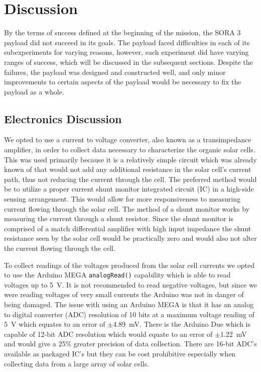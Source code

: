 \section{Discussion}
\label{sec:Discussion}

By the terms of success defined at the beginning of the mission, the SORA 3 payload did not succeed in its goals.
The payload faced difficulties in each of its subexperiments for varying reasons, however, each experiment did have varying ranges of success, which will be discussed in the subsequent sections.
Despite the failures, the payload was designed and constructed well, and only minor improvements to certain aspects of the payload would be necessary to fix the payload as a whole.

\subsection{Electronics Discussion}
We opted to use a current to voltage converter, also known as a transimpedance amplifier, in order to collect data necessary to characterize the organic solar cells.
This was used primarily because it is a relatively simple circuit which was already known of that would not add any additional resistance in the solar cell's current path, thus not reducing the current through the cell.
The preferred method would be to utilize a proper current shunt monitor integrated circuit (IC) in a high-side sensing arrangement.
This would allow for more responsiveness to measuring current flowing through the solar cell.
The method of a shunt monitor works by measuring the current through a shunt resistor.
Since the shunt monitor is comprised of a match differential amplifier with high input impedance the shunt resistance seen by the solar cell would be practically zero and would also not alter the current flowing through the cell.

To collect readings of the voltages produced from the solar cell currents we opted to use the Arduino MEGA \texttt{analogRead()} capability which is able to read voltages up to \SI{5}{\volt}.
It is not recommended to read negative voltages, but since we were reading voltages of very small currents the Arduino was not in danger of being damaged.
The issue with using an Arduino MEGA is that it has an analog to digital converter (ADC) resolution of 10 bits at a maximum voltage reading of \SI{5}{\volt} which equates to an error of $\pm$\SI{4.89}{\milli\volt}.
There is the Arduino Due which is capable of 12-bit ADC resolution which would equate to an error of $\pm$\SI{1.22}{\milli\volt} and would give a 25\% greater precision of data collection.
There are 16-bit ADC's available as packaged IC's but they can be cost prohibitive especially when collecting data from a large array of solar cells.
